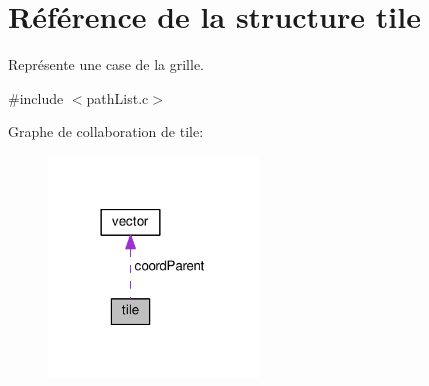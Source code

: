 \hypertarget{structtile}{}\section{Référence de la structure tile}
\label{structtile}


Représente une case de la grille.  




{\ttfamily \#include $<$path\+List.\+c$>$}



Graphe de collaboration de tile\+:\nopagebreak
\begin{figure}[H]
\begin{center}
\leavevmode
\includegraphics[width=158pt]{structtile__coll__graph}
\end{center}
\end{figure}
